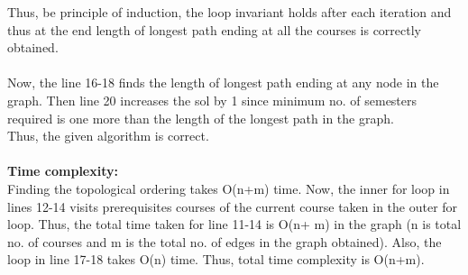 \documentclass{article}
\begin{document}
Thus, be principle of induction, the loop invariant holds after each iteration and thus at the end length of longest path ending at all the courses is correctly obtained.\\
\\
Now, the line 16-18 finds the length of longest path ending at any node in the graph. Then line 20 increases the sol by 1 since minimum no. of semesters required is one more than the length of the longest path in the graph.\\
Thus, the given algorithm is correct.\\
\\
\textbf{Time complexity:}\\
Finding the topological ordering takes O(n+m) time. Now, the inner for loop in lines 12-14 visits prerequisites courses of the current course taken in the outer for loop. Thus, the total time taken for line 11-14 is O(n+ m) in the graph (n is total no. of courses and m is the total no. of edges in the graph obtained). Also, the loop in line 17-18 takes O(n) time. Thus, total time complexity is O(n+m).
\newpage
\end{document}
